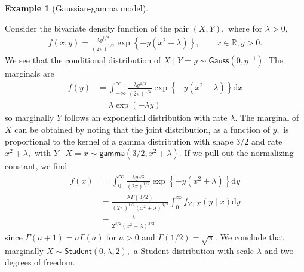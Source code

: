 \documentclass[
  11pt,
  letterpaper,
]{scrbook}
\theoremstyle{definition}
\theoremstyle{plain}
\theoremstyle{plain}
\theoremstyle{definition}
\theoremstyle{definition}
\newtheorem{example}{Example}[chapter]
\theoremstyle{remark}
\begin{document}
\begin{example}[Gaussian-gamma
model]\protect\hypertarget{exm-conditional-marginal}{}\label{exm-conditional-marginal}

Consider the bivariate density function of the pair \((X, Y),\) where
for \(\lambda>0,\) \begin{align*}
f(x,y) = \frac{\lambda y^{1/2}}{(2\pi)^{1/2}}\exp\left\{ - y(x^2 + \lambda)\right\}, \qquad x \in \mathbb{R}, y>0.
\end{align*} We see that the conditional distribution of
\(X \mid Y=y \sim \mathsf{Gauss}(0, y^{-1}).\) The marginals are
\begin{align*}
f(y) &= \int_{-\infty}^\infty \frac{\lambda y^{1/2}}{(2\pi)^{1/2}}\exp\left\{ - y(x^2 + \lambda)\right\} \mathrm{d} x
\\&= \lambda \exp(-\lambda y)
\end{align*} so marginally \(Y\) follows an exponential distribution
with rate \(\lambda.\) The marginal of \(X\) can be obtained by noting
that the joint distribution, as a function of \(y,\) is proportional to
the kernel of a gamma distribution with shape \(3/2\) and rate
\(x^2+\lambda,\) with
\(Y \mid X=x \sim \mathsf{gamma}(3/2, x^2+\lambda).\) If we pull out the
normalizing constant, we find \begin{align*}
f(x) &= \int_{0}^{\infty} \frac{\lambda y^{1/2}}{(2\pi)^{1/2}}\exp\left\{ - y(x^2 + \lambda)\right\} \mathrm{d} y\\&=
\frac{\lambda \Gamma(3/2)}{(2\pi)^{1/2}(x^2+\lambda)^{3/2}} \int_0^\infty f_{Y \mid X}(y \mid x) \mathrm{d} y \\ &= \frac{\lambda}{2^{3/2}(x^2+\lambda)^{3/2}}
\end{align*} since \(\Gamma(a+1) = a\Gamma(a)\) for \(a>0\) and
\(\Gamma(1/2) = \sqrt{\pi}.\) We conclude that marginally
\(X \sim \mathsf{Student}(0, \lambda, 2),\) a Student distribution with
scale \(\lambda\) and two degrees of freedom.

\end{example}
\end{document}
